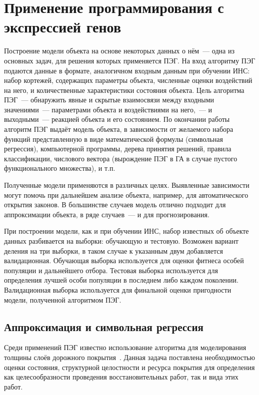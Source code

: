\section{Применение программирования с экспрессией генов}

Построение модели объекта на основе некоторых данных о нём~--- одна из основных задач, для решения которых применяется ПЭГ. На вход алгоритму ПЭГ подаются данные в формате, аналогичном входным данным при обучении ИНС: набор кортежей, содержащих параметры объекта, численные оценки воздействий на него, и количественные характеристики состояния объекта. Цель алгоритма ПЭГ~--- обнаружить явные и скрытые взаимосвязи между входными значениями~--- параметрами объекта и воздействиями на него,~--- и выходными~--- реакцией объекта и его состоянием. По окончании работы алгоритм ПЭГ выдаёт модель объекта, в зависимости от желаемого набора функций представленную в виде математической формулы (символьная регрессия), компьютерной программы, дерева принятия решений, правила классификации, числового вектора (вырождение ПЭГ в ГА в случае пустого функционального множества), и т.п.

Полученные модели применяются в различных целях. Выявленные зависимости могут помочь при дальнейшем анализе объекта, например, для автоматического открытия законов. В большинстве случаев модель отлично подходит для аппроксимации объекта, в ряде случаев~--- и для прогнозирования.

При построении модели, как и при обучении ИНС, набор известных об объекте данных разбивается на выборки: обучающую и тестовую. Возможен вариант деления на три выборки, в таком случае к указанным двум добавляется валидационная. Обучающая выборка используется для оценки фитнеса особей популяции и дальнейшего отбора. Тестовая выборка используется для определения лучшей особи популяции в последнем либо каждом поколении. Валидационная выборка используется для финальной оценки пригодности модели, полученной алгоритмом ПЭГ.

\subsection{Аппроксимация и символьная регрессия}

Среди применений ПЭГ известно использование алгоритма для моделирования толщины слоёв дорожного покрытия~\cite{Terzi:2005:JAS, saltan:2005:IJEMS}. Данная задача поставлена необходимостью оценки состояния, структурной целостности и ресурса покрытия для определения как целесообразности проведения восстановительных работ, так и вида этих работ.

